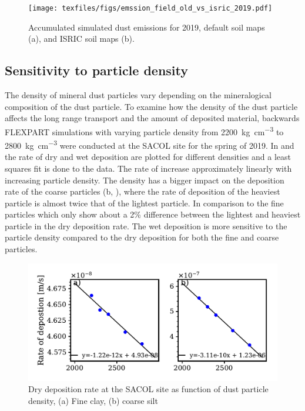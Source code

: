 \begin{figure}[htpb]
    \centering
    \texttt{[image: texfiles/figs/emssion\_field\_old\_vs\_isric\_2019.pdf]}
    \caption{Accumulated simulated dust emissions for 2019, default soil maps (a), and ISRIC soil maps (b).}
    \label{fig:emissions_ISRIC_old_com}
\end{figure}
\subsection{Sensitivity to particle density}\label{sec:density_experiment}
The density of mineral dust particles vary depending on the mineralogical composition of the dust particle. To examine how the density of the dust particle affects the long range transport and the amount of deposited material, backwards
FLEXPART simulations with varying particle density from \SI{2200}{\kg\per\cubic\cm} to \SI{2800}{\kg\per\cubic\cm}  were conducted  at the SACOL site for the spring of 2019. 
In  and  the rate of dry and wet deposition are plotted for different densities and a least squares fit is done to the data. The rate of  increase approximately linearly with increasing particle density. The density has a bigger impact on the deposition rate of the coarse particles (b, ), where the rate of deposition of the heaviest particle is almost twice that of the lightest particle. In comparison to the fine particles which only show about a 2\% difference between the lightest and heaviest particle in the dry deposition rate. The wet deposition is more sensitive to the particle density compared to the dry deposition for both the fine and coarse particles. 
\begin{figure}[hptb]
    \centering
    \includegraphics[width=\textwidth]{texfiles/figs/drydep_function_of_density.pdf}
    \caption{Dry deposition rate at the SACOL site as function of dust particle density, (a) Fine clay, (b) coarse silt}
    \label{fig:dry_dep_density}
\end{figure}

